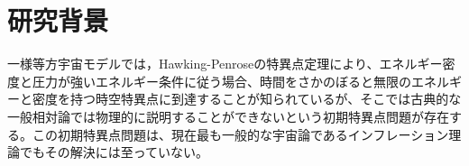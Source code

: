 \section{研究背景}
一様等方宇宙モデルでは，Hawking-Penroseの特異点定理により、エネルギー密度と圧力が強いエネルギー条件に従う場合、時間をさかのぼると無限のエネルギーと密度を持つ時空特異点に到達することが知られているが、そこでは古典的な一般相対論では物理的に説明することができないという初期特異点問題が存在する。この初期特異点問題は、現在最も一般的な宇宙論であるインフレーション理論でもその解決には至っていない。